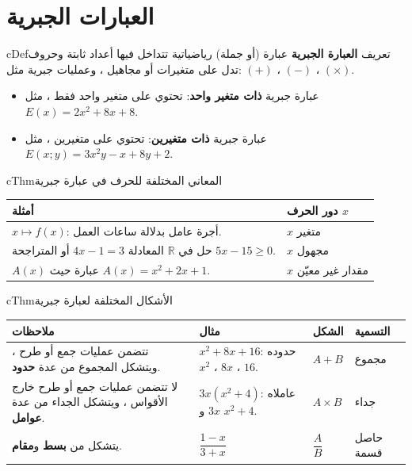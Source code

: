 \documentclass[12pt,a4paper]{article}
\newenvironment{BOX}[2]{\begin{otherlanguage}{english}\begin{arbox}{#1}{#2}}{\end{arbox}\end{otherlanguage}}
\newenvironment{tarif}[1][تعريف]{\begin{BOX}{cDef}{#1}}{\end{BOX}}
\newenvironment{khassia}[1][خاصية]{\begin{BOX}{cThm}{#1}}{\end{BOX}}
\newcommand{\R}{\mathbb{R}}
\begin{document}
\section{العبارات الجبرية}
\begin{tarif}
\textbf{العبارة الجبرية} عبارة (أو جملة) رياضياتية تتداخل فيها أعداد ثابتة وحروف تدل على متغيرات أو مجاهيل ، وعمليات جبرية مثل: $(+)$ ، $(-)$ ، $(\times)$.
\begin{itemize}
\item عبارة جبرية \textbf{ذات متغير واحد}: تحتوي على متغير واحد فقط ، مثل $E(x)=2x^2+8x+8$.
\item عبارة جبرية \textbf{ذات متغيرين}: تحتوي على متغيرين ، مثل $E(x;y)=3x^2y-x+8y+2$.
\end{itemize}
\end{tarif}
\begin{khassia}[المعاني المختلفة للحرف في عبارة جبرية]
\begin{center}
\renewcommand{\arraystretch}{1.5}
\begin{tabular}{|p{}|p{}|}\hline
\rowcolor{cSec!12}\textbf{أمثلة} & \textbf{دور الحرف $x$}\\\hline
$x\mapsto f(x)$: أجرة عامل بدلالة ساعات العمل. & $x$ متغير\\\hline
حل في $\R$ المعادلة $4x-1=3$ أو المتراجحة $5x-15\geqslant0$. & $x$ مجهول\\\hline
$A(x)$ عبارة حيث $A(x)=x^2+2x+1$. & $x$ مقدار غير معيّن\\\hline
\end{tabular}
\end{center}
\end{khassia}
\begin{khassia}[الأشكال المختلفة لعبارة جبرية]
\begin{center}
\renewcommand{\arraystretch}{1.5}
\begin{tabular}{|p{}|p{}|p{}|p{}|}\hline
\rowcolor{cSec!12}\textbf{ملاحظات} & \textbf{مثال} & \textbf{الشكل} & \textbf{التسمية}\\\hline
تتضمن عمليات جمع أو طرح ، ويتشكل المجموع من عدة \textbf{حدود}. & $x^2+8x+16$: حدوده $x^2$ ، $8x$ ، $16$. & $A+B$ & مجموع\\\hline
لا تتضمن عمليات جمع أو طرح خارج الأقواس ، ويتشكل الجداء من عدة \textbf{عوامل}. & $3x\left(x^2+4\right)$: عاملاه $3x$ و $x^2+4$. & $A\times B$ & جداء\\\hline
يتشكل من \textbf{بسط} و\textbf{مقام}. & $\dfrac{1-x}{3+x}$ & $\dfrac AB$ & حاصل قسمة\\\hline
\end{tabular}
\end{center}
\end{khassia}
\end{document}
